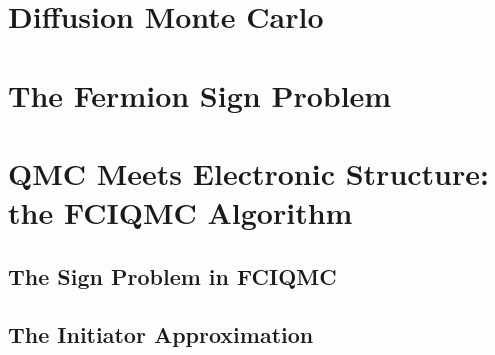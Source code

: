 \section{Diffusion Monte Carlo}

\section{The Fermion Sign Problem}

\section{QMC Meets Electronic Structure: the FCIQMC Algorithm}

\subsection{The Sign Problem in FCIQMC}

\subsection{The Initiator Approximation}
